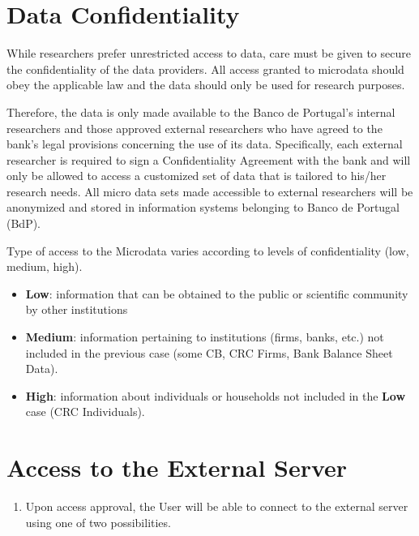 \documentclass[]{book}
\providecommand{\tightlist}{%
  \setlength{\itemsep}{0pt}\setlength{\parskip}{0pt}}
\begin{document}
\hypertarget{data-confidentiality}{%
\section{\texorpdfstring{{Data Confidentiality}}{Data Confidentiality}}\label{data-confidentiality}}

While researchers prefer unrestricted access to data, care must be
given to secure the confidentiality of the data providers. All access
granted to microdata should obey the applicable law and the data
should only be used for research purposes.

Therefore, the data is only made available to the Banco de Portugal's
internal researchers and those approved external researchers who have
agreed to the bank's legal provisions concerning the use of its data.
Specifically, each external researcher is required to sign a
Confidentiality Agreement with the bank and will only be allowed to
access a customized set of data that is tailored to his/her research
needs. All micro data sets made accessible to external researchers
will be anonymized and stored in information systems belonging to
Banco de Portugal (BdP).

Type of access to the Microdata varies according to levels of
confidentiality (low, medium, high).

\begin{itemize}
\item
  \textbf{Low}: information that can be obtained to the public or
  scientific community by other institutions
\item
  \textbf{Medium}: information pertaining to institutions (firms, banks,
  etc.) not included in the previous case (some CB, CRC Firms, Bank
  Balance Sheet Data).
\item
  \textbf{High}: information about individuals or households not included
  in the \textbf{Low} case (CRC Individuals).
\end{itemize}

\hypertarget{access-to-the-external-server}{%
\section{\texorpdfstring{{Access to the External Server}}{Access to the External Server}}\label{access-to-the-external-server}}

\begin{enumerate}
\def\labelenumi{\arabic{enumi}.}
\tightlist
\item
  Upon access approval, the User will be able to connect to the external server using one of two possibilities.
\end{enumerate}
\end{document}
